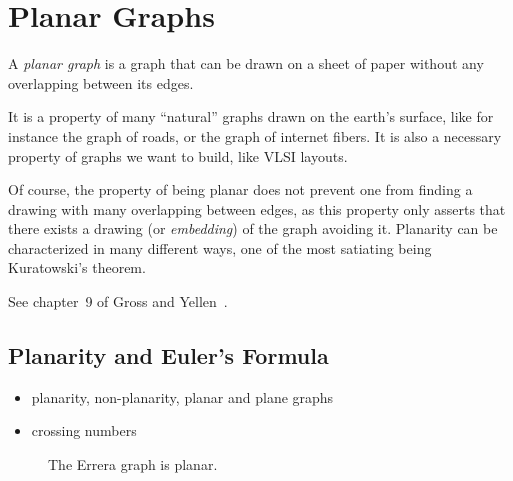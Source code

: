 
\chapter{Planar Graphs}
\label{chap:planar_graphs}

A {\it planar graph} is a graph that can be drawn on a sheet of paper without any overlapping between its edges.

It is a property of many ``natural'' graphs drawn on the earth's surface, like for instance the graph of roads, or the graph of internet fibers. It is also a necessary property of graphs we want to build, like VLSI layouts.

Of course, the property of being planar does not prevent one from finding a drawing with many overlapping between edges, as this property only asserts that there exists a drawing (or {\it embedding}) of the graph avoiding it. Planarity can be characterized in many different ways, one of the most satiating being Kuratowski's theorem.

See chapter~9 of Gross and Yellen~\cite{GrossYellen1999}.



\section{Planarity and Euler's Formula}

\begin{itemize}
\item planarity, non-planarity, planar and plane graphs

\item crossing numbers
\end{itemize}

\begin{figure}[!htbp]
\centering

\caption{The Errera graph is planar.}
\label{fig:planar_graphs:Errera_graph}
\end{figure}

